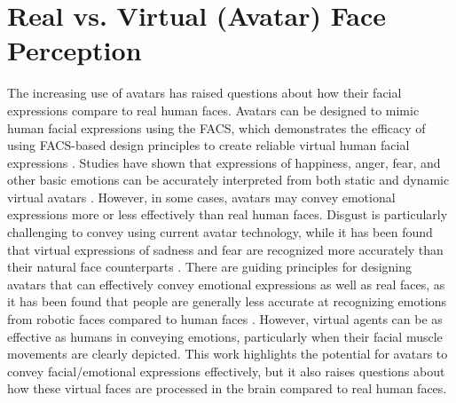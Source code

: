 \section{Real vs. Virtual (Avatar) Face Perception}
The increasing use of avatars has raised questions about how their facial expressions compare to real human faces.
Avatars can be designed to mimic human facial expressions using the FACS, which demonstrates the efficacy of using FACS-based design principles to create reliable virtual human facial expressions \citep{garcia_design_2020}.
Studies have shown that expressions of happiness, anger, fear, and other basic emotions can be accurately interpreted from both static and dynamic virtual avatars \citep{de_paolis_perception_2015, dyck_recognition_2008}.
However, in some cases, avatars may convey emotional expressions more or less effectively than real human faces. 
Disgust is particularly challenging to convey using current avatar technology, while it has been found that virtual expressions of sadness and fear are recognized more accurately than their natural face counterparts \citep{dyck_recognition_2008}.
There are guiding principles for designing avatars that can effectively convey emotional expressions as well as real faces, as it has been found that people are generally less accurate at recognizing emotions from robotic faces compared to human faces \citep{hortensius_perception_2018}.
However, virtual agents can be as effective as humans in conveying emotions, particularly when their facial muscle movements are clearly depicted.
This work highlights the potential for avatars to convey facial/emotional expressions effectively, but it also raises questions about how these virtual faces are processed in the brain compared to real human faces.


